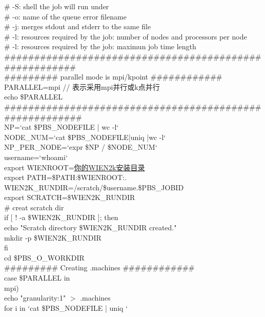 \documentclass[10pt,a4paper]{article}
\begin{document}
\# -S: shell the job will run under\\
\# -o: name of the queue error filename\\
\# -j: merges stdout and stderr to the same file\\
\# -l: resources required by the job: number of nodes and processors per node\\
\# -l: resources required by the job: maximun job time length\\
\#\#\#\#\#\#\#\#\#\#\#\#\#\#\#\#\#\#\#\#\#\#\#\#\#\#\#\#\#\#\#\#\#\#\#\#\#\#\#\#\#\#\#\#\#\#\#\#\#\#\#\#\#\#\#\\%
\#\#\#\#\#\#\#\#\# parallel mode is mpi/kpoint \#\#\#\#\#\#\#\#\#\#\#\#\\
PARALLEL=mpi // 表示采用\textrm{mpi}并行或\textrm{k}点并行\\
echo \$PARALLEL\\
\#\#\#\#\#\#\#\#\#\#\#\#\#\#\#\#\#\#\#\#\#\#\#\#\#\#\#\#\#\#\#\#\#\#\#\#\#\#\#\#\#\#\#\#\#\#\#\#\#\#\#\#\#\#\#\#\\%
NP=`cat \${PBS\_NODEFILE} | wc -l` \\
NODE\_NUM=`cat \$PBS\_NODEFILE|uniq |wc -l` \\
NP\_PER\_NODE=`expr \$NP / \$NODE\_NUM` \\
username=`whoami` \\
export WIENROOT=\underline{你的WIEN2k安装目录} \\
export PATH=\$PATH:\$WIENROOT:. \\
WIEN2K\_RUNDIR=/scratch/\${username}.\${PBS\_JOBID} \\
export SCRATCH=\${WIEN2K\_RUNDIR} \\
\# creat scratch dir \\
if [ ! -a \$WIEN2K\_RUNDIR ]; then \\
echo "Scratch directory \$WIEN2K\_RUNDIR created." \\
mkdir -p \$WIEN2K\_RUNDIR \\
fi \\
cd \$PBS\_O\_WORKDIR \\
\#\#\#\#\#\#\#\#\# Creating .machines \#\#\#\#\#\#\#\#\#\#\#\# \\
case \$PARALLEL in \\
mpi) \\
echo "granularity:1" $>$ .machines \\
for i in `cat \$PBS\_NODEFILE | uniq ` \\
\end{document}
